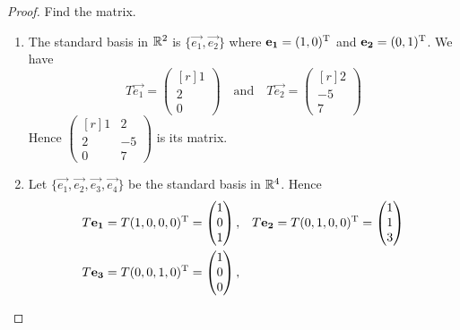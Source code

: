 \begin{proof}
  Find the matrix.
  \begin{enumerate}
    \item The standard basis in $\mathbb{R}^2$ is $\{\vec{e_1},\vec{e_2}\}$ where
      $\mathbf{e_1}=(1,0)^\mathrm{T}$ and $\mathbf{e_2}=(0,1)^\mathrm{T}$. We have
      \[
        T\vec{e_1}= \begin{pmatrix*}[r] 1\\2\\0 \end{pmatrix*}
        \quad\text{and}\quad
        T\vec{e_2}= \begin{pmatrix*}[r] 2\\-5\\7 \end{pmatrix*}
      \]
      Hence
      $
        \begin{pmatrix*}[r]
          1&2\\
          2&-5\\
          0&7
        \end{pmatrix*}
      $ is its matrix.
    \item Let $\{\vec{e_1},\vec{e_2},\vec{e_3},\vec{e_4}\}$ be the standard 
      basis in $\mathbb{R}^4$. Hence
      \begin{align*}
        &T\vec{e_1}=T(1,0,0,0)\tran = \begin{pmatrix} 1\\0\\1 \end{pmatrix},
        &&T\vec{e_2}=T(0,1,0,0)\tran= \begin{pmatrix} 1\\1\\3 \end{pmatrix}\\
        &T\vec{e_3}=T(0,0,1,0)\tran= \begin{pmatrix} 1 \\0\\0 \end{pmatrix},

\end{align*}
\end{enumerate}
\end{proof}
